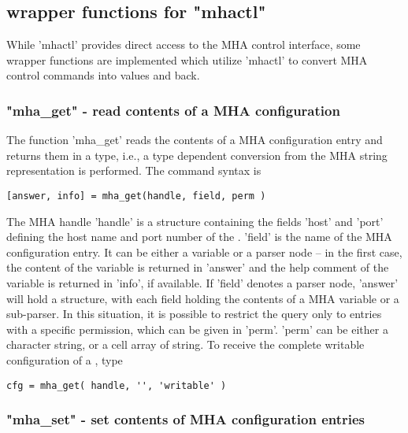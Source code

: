 \subsection{\Matlab{} wrapper functions for "mhactl"}
\label{sec:mhactl_wrapper}

While 'mhactl' provides direct access to the MHA control interface,
some wrapper functions are implemented which utilize 'mhactl' to
convert MHA control commands into \Matlab{} values and back.

\subsubsection{"mha\_get" - read contents of a MHA configuration}

The function 'mha\_get' reads the contents of a MHA configuration
entry and returns them in a \Matlab{} type, i.e., a type dependent
conversion from the MHA string representation is performed. The
command syntax is
\begin{verbatim}[answer, info] = mha_get(handle, field, perm )\end{verbatim}
The MHA handle 'handle' is a structure containing the fields 'host'
and 'port' defining the host name and port number of the \mhad{}.
%
'field' is the name of the MHA configuration entry.
%
It can be either a variable or a parser node -- in the first case, the
content of the variable is returned in 'answer' and the help comment
of the variable is returned in 'info', if available.
%
If 'field' denotes a parser node, 'answer' will hold a \Matlab{}
structure, with each field holding the contents of a MHA variable or a
sub-parser.
%
In this situation, it is possible to restrict the query only to
entries with a specific permission, which can be given in 'perm'.
%
'perm' can be either a character string, or a cell array of string.
%
To receive the complete writable configuration of a \mhad{}, type
\begin{verbatim}cfg = mha_get( handle, '', 'writable' )\end{verbatim}
%

\subsubsection{"mha\_set" - set contents of MHA configuration entries}

